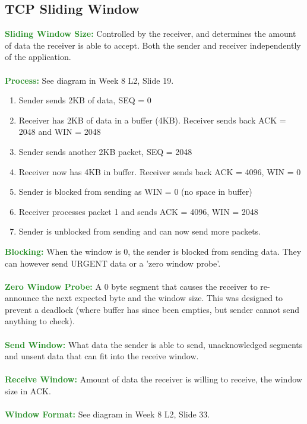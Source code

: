 \documentclass[a4paper,10pt]{article}
\begin{document}
\subsection{TCP Sliding Window}
\textcolor{ForestGreen}{\textbf{Sliding Window Size:}} Controlled by the receiver, and determines the amount of data the receiver is able to accept. Both the sender and receiver independently of the application. \\\\  
\textcolor{ForestGreen}{\textbf{Process:}} See diagram in Week 8 L2, Slide 19. 
\begin{enumerate}
	\item Sender sends 2KB of data, SEQ = 0 
	\item Receiver has 2KB of data in a buffer (4KB). Receiver sends back ACK = 2048 and WIN = 2048
	\item Sender sends another 2KB packet, SEQ = 2048 
	\item Receiver now has 4KB in buffer. Receiver sends back ACK = 4096, WIN = 0
	\item Sender is blocked from sending as WIN = 0 (no space in buffer)
	\item Receiver processes packet 1 and sends ACK = 4096, WIN = 2048
	\item Sender is unblocked from sending and can now send more packets. 
\end{enumerate}
\textcolor{ForestGreen}{\textbf{Blocking:}} When the window is 0, the sender is blocked from sending data. They can however send URGENT data or a 'zero window probe'. \\\\
\textcolor{ForestGreen}{\textbf{Zero Window Probe:}} A 0 byte segment that causes the receiver to re-announce the next expected byte and the window size. This was designed to prevent a deadlock (where buffer has since been empties, but sender cannot send anything to check). \\\\
\textcolor{ForestGreen}{\textbf{Send Window:}} What data the sender is able to send, unacknowledged segments and unsent data that can fit into the receive window. \\\\
\textcolor{ForestGreen}{\textbf{Receive Window:}} Amount of data the receiver is willing to receive, the window size in ACK. \\\\
\newpage
\noindent \textcolor{ForestGreen}{\textbf{Window Format:}} See diagram in Week 8 L2, Slide 33. 
\end{document}
